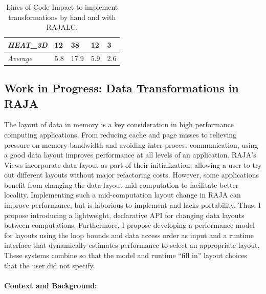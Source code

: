 \documentclass{article}
\begin{document}
\begin{table}[t]
\begin{tabular}{|l|l|l|l|l|}
    \\
    \textit{HEAT\_3D}        & 12                                              & 38                                           & 12                                             & 3                                            \\ \hline
    \textit{Average}        & 5.8                                              & 17.9                                           & 5.9                                            & 2.6                                            \\ \hline
    \end{tabular}
    \caption{Lines of Code Impact to implement transformations by hand and with RAJALC.}\label{sloc}
    \end{table}


\subsection{Work in Progress: Data Transformations in RAJA}
\label{Sec:Work2}
The layout of data in memory is a key consideration in high performance computing applications.
From reducing cache and page misses to relieving pressure on memory bandwidth and avoiding inter-process communication, using a good data layout improves performance at all levels of an application.
RAJA's Views incorporate data layout as part of their initialization, allowing a user to try out different layouts without major refactoring costs.
However, some applications benefit from changing the data layout mid-computation to facilitate better locality.
Implementing such a mid-computation layout change in RAJA can improve performance, but is laborious to implement and lacks portability.
Thus, I propose introducing a lightweight, declarative API for changing data layouts between computations.
Furthermore, I propose developing a performance model for layouts using the loop bounds and data access order as input and a runtime interface that dynamically estimates performance to select an appropriate layout. 
These systems combine so that the model and runtime \enquote{fill in} layout choices that the user did not specify.

\paragraph{Context and Background:}
\end{document}
